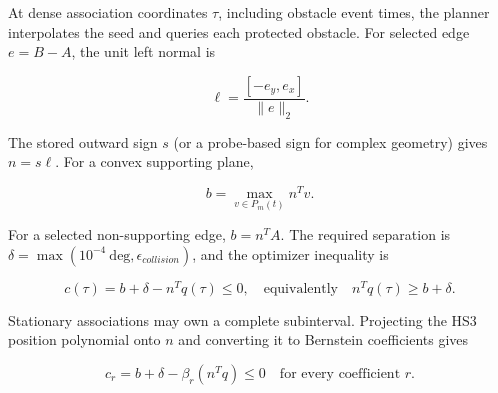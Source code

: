 \documentclass[10pt,letterpaper]{article}
\begin{document}
At dense association coordinates $\tau$, including obstacle event times, the
planner interpolates the seed and queries each protected obstacle. For selected
edge $e=B-A$, the unit left normal is

\begin{equation}
\ell=\frac{[-e_y,e_x]}{\lVert e\rVert_2}.
\end{equation}

The stored outward sign $s$ (or a probe-based sign for complex geometry) gives
$n=s\ell$. For a convex supporting plane,

\begin{equation}
b=\max_{v\in P_m(t)} n^Tv.
\end{equation}

For a selected non-supporting edge, $b=n^TA$. The required separation is
$\delta=\max(10^{-4}\ \mathrm{deg},\epsilon_{collision})$, and the optimizer
inequality is

\begin{equation}\label{eq:obstaclehalfspace}
c(\tau)=b+\delta-n^Tq(\tau)\le0,
\quad\text{equivalently}\quad n^Tq(\tau)\ge b+\delta.
\end{equation}

Stationary associations may own a complete subinterval. Projecting the HS3
position polynomial onto $n$ and converting it to Bernstein coefficients gives

\begin{equation}
c_r=b+\delta-\beta_r(n^Tq)\le0\quad\text{for every coefficient }r.
\end{equation}
\end{document}
